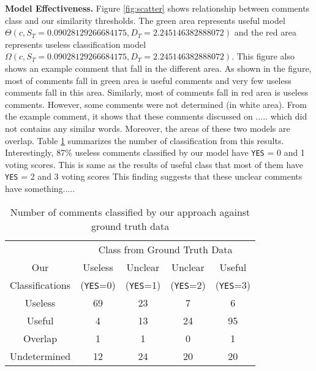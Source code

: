 \textbf{Model Effectiveness.} Figure \ref{fig:scatter} shows relationship between comments class and our similarity thresholds. The green area represents useful model $\Theta(c,S_T=0.09028129266684175,D_T= 2.245146382888072)$ and the red area represents useless classification model $\Omega(c,S_T=0.09028129266684175,D_T= 2.245146382888072)$. This figure also shows an example comment that fall in the different area. As shown in the figure, most of comments fall in green area is useful comments and very few useless comments fall in this area. Similarly, most of comments fall in red area is useless comments. However, some comments were not determined (in white area). From the example comment, it shows that these comments discussed on ..... which did not contains any similar words. Moreover, the areas of these two models are overlap. Table \ref{tb:classify_number} summarizes the number of classification from this results. Interestingly, 87\% useless comments classified by our model have \texttt{YES} = 0 and 1 voting scores. This is same as the results of useful class that most of them have \texttt{YES} = 2 and 3 voting scores
This finding suggests that these unclear comments have something.....

\begin{table}[h]
\centering
\small
\caption{Number of comments classified by our approach against ground truth data }
\begin{tabular}{ccccc}
\hline
& \multicolumn{4}{c}{Class from Ground Truth Data} \\ \cline{2-5}
Our&  Useless  & Unclear  & Unclear & Useful \\
Classifications&  (\texttt{YES}=0) & (\texttt{YES}=1) & (\texttt{YES}=2) & (\texttt{YES}=3) \\
\hline \hline
Useless & 69 & 23 & 7 & 6 \\
Useful & 4 & 13 & 24 & 95 \\
Overlap & 1 & 1 & 0 & 1 \\
Undetermined & 12 & 24 & 20 & 20 \\
\hline
\end{tabular}
\label{tb:classify_number}
\end{table}


